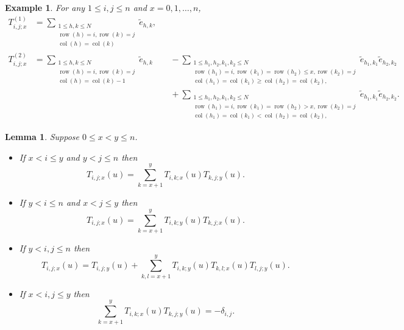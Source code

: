 \documentclass[twoside,12pt,reqno]{amsart}
\newtheorem{Lemma}[Proposition]{Lemma}
\newtheorem{Example}[Proposition]{Example}
\def\row{\operatorname{row}}
\def\col{\operatorname{col}}
\begin{document}
\begin{Example}\label{eggy}\rm
For any $1 \leq i,j \leq n$ and $x = 0,1,\dots,n$,
\begin{align*}
T_{i,j;x}^{(1)} &= 
\sum_{\substack{1 \leq h,k \leq N \\ \row(h) = i, \row(k) = j
\\ \col(h) = \col(k)}} \tilde e_{h,k},\\
T_{i,j;x}^{(2)} &= 
\sum_{\substack{1 \leq h,k \leq N \\ \row(h) = i, \row(k) = j \\
\col(h) = \col(k)-1}} \tilde e_{h,k}
&&\!\!\!\!\!-\!\!\!\!\! \sum_{\substack{1 \leq h_1,h_2,k_1,k_2 \leq N\\
\row(h_1) = i, \row(k_1)=\row(h_2) \leq x, \row(k_2)=j \\
\col(h_1)=\col(k_1) \geq \col(h_2)=\col(k_2),
}} \!\!\!\!\!\!\!\!\!\!\!\!\!\!\!\!\!\!\!\!\tilde e_{h_1,k_1} \tilde e_{h_2,k_2}\\
&&&\!\!\!\!\!+\!\!\!\!\! \sum_{\substack{1 \leq h_1,h_2,k_1,k_2 \leq N\\
\row(h_1) = i, \row(k_1)=\row(h_2) > x, \row(k_2)=j \\
\col(h_1)=\col(k_1) < \col(h_2)=\col(k_2),
}} \!\!\!\!\!\!\!\!\!\!\!\!\!\!\!\!\!\!\!\!\tilde e_{h_1,k_1} \tilde e_{h_2,k_2}.
\end{align*}
\end{Example}

\begin{Lemma}\label{traninv}
Suppose $0 \leq x < y \leq n$.
\begin{itemize}
\item[(i)] If $x < i \leq y$ and $y < j \leq n$ then
$$
T_{i,j;x}(u) = \sum_{k=x+1}^y T_{i,k;x}(u) T_{k,j;y}(u).
$$
\item[(ii)] If $y < i \leq n$ and $x < j \leq y$ then
$$
T_{i,j;x}(u) = \sum_{k=x+1}^y T_{i,k;y}(u) T_{k,j;x}(u).
$$
\item[(iii)] If $y < i,j \leq n$ then
$$
T_{i,j;x}(u) = T_{i,j;y}(u)
+ \sum_{k,l=x+1}^y T_{i,k;y}(u) T_{k,l;x}(u) T_{l,j;y}(u).
$$
\item[(iv)]
If $x < i,j \leq y$ then
$$
\sum_{k=x+1}^y T_{i,k;x}(u) T_{k,j;y}(u) = -\delta_{i,j}.
$$
\end{itemize}
\end{Lemma}
\end{document}
